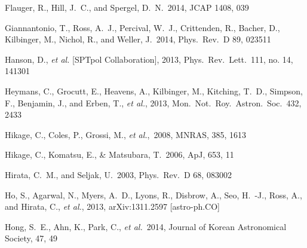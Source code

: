 \begin{thebibliography}{99}
\begin{multicols}{2}
{ 
  Flauger, R., Hill, J.~C., and Spergel, D.~N.\ 2014,
  JCAP 1408, 039


  Giannantonio, T., Ross, A.~J., Percival, W.~J., Crittenden, R., Bacher, D., Kilbinger, M., Nichol, R., and Weller, J.\ 2014,
  Phys.\ Rev.\ D 89, 023511


  Hanson, D., {\it et al.}  [SPTpol Collaboration], 2013,
  Phys.\ Rev.\ Lett.\ 111, no. 14, 141301

  Heymans, C., Grocutt, E., Heavens, A., Kilbinger, M., Kitching, T.~D., Simpson, F., Benjamin, J., and Erben, T., {\it et al.}, 2013,
  Mon.\ Not.\ Roy.\ Astron.\ Soc.\ 432, 2433

 Hikage, C., Coles, P., 
Grossi, M., {\it et al.},\ 2008, MNRAS, 385, 1613

 Hikage, C., Komatsu, E., 
\& Matsubara, T.\ 2006, ApJ, 653, 11 

  Hirata, C.~M., and Seljak, U.\ 2003,
  Phys.\ Rev.\ D 68, 083002

  Ho, S., Agarwal, N., Myers, A.~D., Lyons, R., Disbrow, A., Seo, H.~-J., Ross, A., and Hirata, C., {\it et al.}, 2013,
  arXiv:1311.2597 [astro-ph.CO]

 Hong, S.~E., Ahn, K., 
Park, C., {\it et al.}\ 2014, Journal of Korean Astronomical Society, 47, 49 


}
\end{multicols}
\end{thebibliography}
